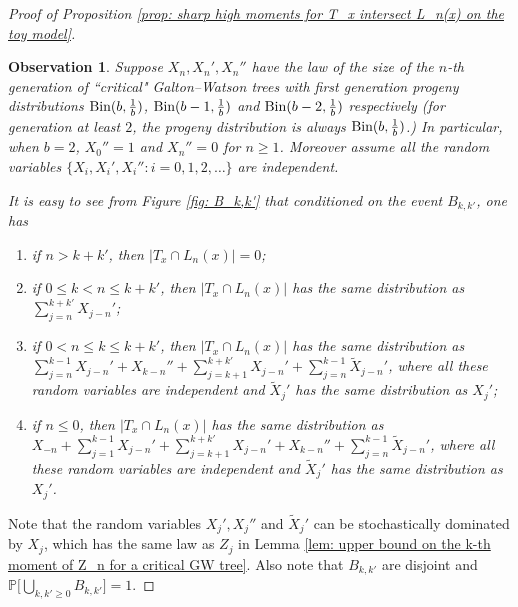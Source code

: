 \documentclass[12pt]{article}
\newtheorem{observation}[theorem]{Observation}
\numberwithin{equation}{section}
\newcommand{\1}{\mathbf{1}}
\begin{document}
\begin{proof}[Proof of Proposition \ref{prop: sharp high moments for T_x intersect L_n(x) on the toy model}]
\begin{observation}\label{obs: T_x under B_k,k'}
	Suppose  $X_n,X_n',X_n''$ have the law of the size of the $n$-th generation of ``critical"  Galton--Watson trees with first generation progeny distributions  $\textnormal{Bin}(b,\frac{1}{b})$, $\textnormal{Bin}(b-1,\frac{1}{b})$ and $\textnormal{Bin}(b-2,\frac{1}{b})$ respectively (for generation at least $2$, the progeny distribution is always $\textnormal{Bin}(b,\frac{1}{b})$.)  In particular, when $b=2$, $X_0''=1$ and $X_n''=0$ for $n\geq1$. Moreover assume all the random variables $\{X_i,X_i',X_i''\colon i=0,1,2,\ldots \}$ are independent. 
	
	It is easy to see from Figure \ref{fig: B_k,k'} that conditioned on the event $B_{k,k'}$, one has 
	\begin{enumerate}
		\item if $n>k+k'$, then $|T_x\cap L_n(x)|=0$;
		\item if $0\leq k<n\leq k+k'$, then $|T_x\cap L_n(x)|$ has the same distribution as $\sum_{j=n}^{k+k'}X_{j-n}'$;
		\item if $0<n\leq k\leq k+k'$, then $|T_x\cap L_n(x)|$ has the same distribution as $\sum_{j=n}^{k-1}X_{j-n}'+X_{k-n}''+\sum_{j=k+1}^{k+k'}X_{j-n}'+\sum_{j=n}^{k-1}\widetilde{X}_{j-n}'$, where all these random variables  are independent and $\widetilde{X}_j'$ has the same distribution as $X_j'$;
		\item if $n\leq0$, then $|T_x\cap L_n(x)|$ has the same distribution as $X_{-n}+\sum_{j=1}^{k-1}X_{j-n}'+\sum_{j=k+1}^{k+k'}X_{j-n}'+X_{k-n}''+\sum_{j=n}^{k-1}\widetilde{X}_{j-n}'$, where all these random variables  are independent and $\widetilde{X}_j'$ has the same distribution as $X_j'$.
	\end{enumerate}
\end{observation}

Note that  the random variables $X_j',X_j''$ and $\widetilde{X}_j'$ can be stochastically dominated by $X_j$, which has the same law as $Z_j$ in Lemma \ref{lem: upper bound on the k-th moment of Z_n for a critical GW tree}. Also note that $B_{k,k'}$ are disjoint and $\mathbb{P}\big[\bigcup_{k,k'\geq0} B_{k,k'}\big]=1$. 


\end{proof}
\end{document}
